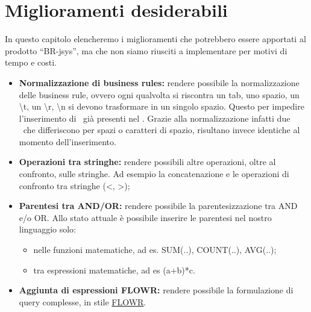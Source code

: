 \chapter{Miglioramenti desiderabili}
In questo capitolo elencheremo i miglioramenti che potrebbero essere apportati al prodotto ``BR-jsys'', ma che non siamo riusciti a implementare per motivi di tempo e costi. 
\begin{itemize}
\item \textbf{Normalizzazione di business rules:} rendere possibile la normalizzazione delle business rule, ovvero ogni qualvolta si riscontra un tab, uno spazio, un \textbackslash t, un \textbackslash r, \textbackslash n si devono trasformare in un singolo spazio. Questo per impedire l'inserimento di \br\ gi\`a presenti nel \rp. Grazie alla normalizzazione infatti due \br\ che differiscono per spazi o caratteri di spazio, risultano invece identiche al momento dell'inserimento. 
\item \textbf{Operazioni tra stringhe:} rendere possibili altre operazioni, oltre al confronto, sulle stringhe. Ad esempio la concatenazione e le operazioni di confronto tra stringhe (\textless, \textgreater); 
\item \textbf{Parentesi tra AND/OR:} rendere possibile la parentesizzazione tra AND e/o OR. Allo stato attuale \`e possibile inserire le parentesi nel nostro linguaggio solo:
\begin{itemize}
\item nelle funzioni matematiche, ad es. SUM(..), COUNT(..), AVG(..);
\item tra espressioni matematiche, ad es (a+b)*c.
\end{itemize}
\item \textbf{Aggiunta di espressioni FLOWR:} rendere possibile la formulazione di query complesse, in stile \underline{FLOWR}.
\end{itemize}

